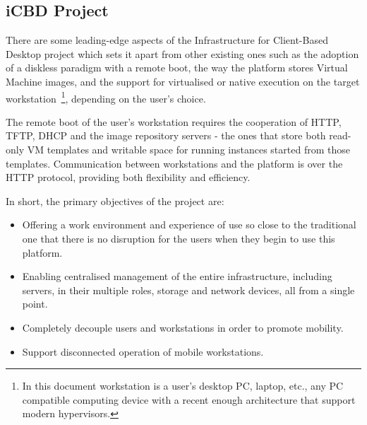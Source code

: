 

\subsection{iCBD Project} %
\label{sub:intro_icbd_project}

There are some leading-edge aspects of the Infrastructure for Client-Based Desktop project which sets it apart from other existing ones such as the adoption of a diskless paradigm with a remote boot, the way the platform stores Virtual Machine images, and the support for virtualised or native execution on the target workstation~\footnote{In this document workstation is a user's desktop PC, laptop, etc., any PC compatible computing device with a recent enough architecture that support modern hypervisors.}, depending on the user’s choice.~\cite{P2020}

The remote boot of the user’s workstation requires the cooperation of HTTP, TFTP, DHCP and the image repository servers - the ones that store both read-only VM templates and writable space for running
instances started from those templates. Communication between workstations and the platform is over the HTTP protocol, providing both flexibility and efficiency.~\cite{P2020,Nuno2016,Eduardo2016}



In short, the primary objectives of the project are:

\begin{itemize}
    \item Offering a work environment and experience of use so close to the traditional one that there is no disruption for the users when they begin to use this platform.
    \item Enabling centralised management of the entire infrastructure, including servers, in their multiple roles, storage and network devices, all from a single point.
    \item Completely decouple users and workstations in order to promote mobility.
    \item Support disconnected operation of mobile workstations.
\end{itemize}

